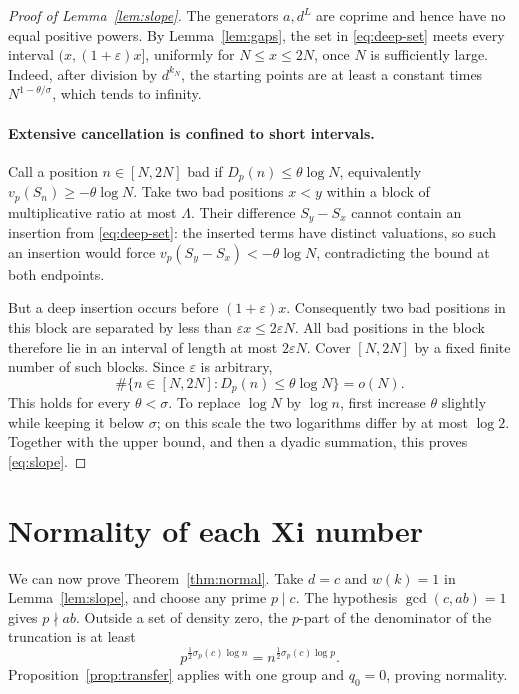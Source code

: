 \documentclass[11pt]{article}
\begin{document}
\begin{proof}[Proof of Lemma~\ref{lem:slope}]
The generators \(a,d^L\) are coprime and hence have no equal positive
powers. By Lemma~\ref{lem:gaps}, the set in \eqref{eq:deep-set}
meets every interval \((x,(1+\varepsilon)x]\), uniformly for
\(N\le x\le2N\), once \(N\) is sufficiently large. Indeed,
after division by \(d^{k_N}\), the starting points are at least a
constant times \(N^{1-\theta/\sigma}\), which tends to infinity.

\paragraph{Extensive cancellation is confined to short intervals.}
Call a position \(n\in[N,2N]\) bad if
\(D_p(n)\le\theta\log N\), equivalently
\(v_p(S_n)\ge-\theta\log N\). Take two bad positions \(x<y\)
within a block of multiplicative ratio at most \(\Lambda\).
Their difference \(S_y-S_x\) cannot contain an insertion from
\eqref{eq:deep-set}: the inserted terms have distinct valuations,
so such an insertion would force
\(v_p(S_y-S_x)<-\theta\log N\), contradicting the bound at both
endpoints.

But a deep insertion occurs before \((1+\varepsilon)x\).
Consequently two bad positions in this block are separated by less
than \(\varepsilon x\le2\varepsilon N\). All bad positions in the
block therefore lie in an interval of length at most
\(2\varepsilon N\). Cover \([N,2N]\) by a fixed finite number of
such blocks. Since \(\varepsilon\) is arbitrary,
\begin{equation}\label{eq:bad-count}
 \#\{n\in[N,2N]:D_p(n)\le\theta\log N\}=o(N).
\end{equation}
This holds for every \(\theta<\sigma\). To replace \(\log N\)
by \(\log n\), first increase \(\theta\) slightly while keeping
it below \(\sigma\); on this scale the two logarithms differ by at
most \(\log2\). Together with the upper bound, and then a dyadic
summation, this proves \eqref{eq:slope}.
\end{proof}

\section{Normality of each Xi number}

We can now prove Theorem~\ref{thm:normal}. Take \(d=c\) and
\(w(k)=1\) in Lemma~\ref{lem:slope}, and choose any prime
\(p\mid c\). The hypothesis \(\gcd(c,ab)=1\) gives \(p\nmid ab\).
Outside a set of density zero, the \(p\)-part of the denominator
of the truncation is at least
\[
 p^{\frac12\sigma_p(c)\log n}
   =n^{\frac12\sigma_p(c)\log p}.
\]
Proposition~\ref{prop:transfer} applies with one group and \(q_0=0\),
proving normality.
\end{document}
